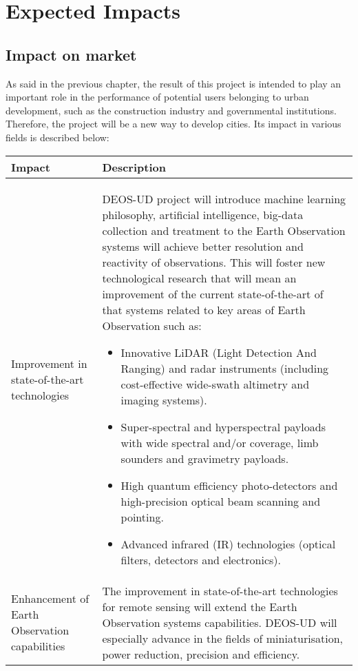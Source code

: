 \section{Expected Impacts}

\subsection{Impact on market}

As said in the previous chapter, the result of this project is intended to play an important role in the performance of potential users belonging to urban development, such as the construction industry and governmental institutions. Therefore, the project will be a new way to develop cities. Its impact in various fields is described below:

\begin{longtable}{p{3cm} p{11cm}}
		
		\toprule[2pt]
		
		\textbf{Impact} &  \textbf{Description}\\
		
		\midrule [1.5pt]
Improvement in state-of-the-art technologies & DEOS-UD project will introduce machine learning philosophy, artificial intelligence, big-data collection and treatment to the Earth Observation systems will achieve better resolution and reactivity of observations. This will foster new technological research that will mean an improvement of the current state-of-the-art of that systems related to key areas of Earth Observation such as: 
		\begin{itemize}  
			\item Innovative LiDAR (Light Detection And Ranging) and radar instruments (including cost-effective wide-swath altimetry and imaging systems).
			\item Super-spectral and hyperspectral payloads with wide spectral and/or coverage, limb sounders and gravimetry payloads.
			\item High quantum efficiency photo-detectors and high-precision optical beam scanning and pointing.
			\item Advanced infrared (IR) technologies (optical filters, detectors and electronics).
		\end{itemize}
	\vspace{0.2cm}\\
		
		\midrule
		
		Enhancement of Earth Observation capabilities & The improvement in state-of-the-art technologies for remote sensing will extend the Earth Observation systems capabilities. DEOS-UD will especially advance in the fields of miniaturisation, power reduction, precision and efficiency.\vspace{0.2cm}\\
		

\end{longtable}
